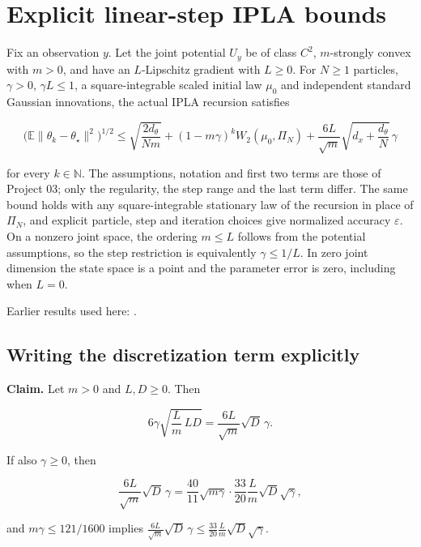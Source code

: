 \documentclass[11pt,a4paper]{report}
\begin{document}
\section{\texorpdfstring{Explicit linear-step IPLA bounds}{Explicit linear-step IPLA bounds}}
\label{proof-module-WassersteinMixing-IPLATheorem-lean}


Fix an observation \(y\). Let the joint potential \(U_y\) be of class \(C^2\), \(m\)-strongly convex with \(m>0\), and have an \(L\)-Lipschitz gradient with \(L\ge0\). For \(N\ge1\) particles, \(\gamma>0\), \(\gamma L\le1\), a square-integrable scaled initial law \(\mu_0\) and independent standard Gaussian innovations, the actual IPLA recursion satisfies

\[\bigl(\mathbb E\|\theta_k-\theta_\star\|^2\bigr)^{1/2}\le\sqrt{\frac{2d_\theta}{Nm}}+(1-m\gamma)^kW_2(\mu_0,\Pi_N)+\frac{6L}{\sqrt m}\sqrt{d_x+\frac{d_\theta}N}\,\gamma\]

for every \(k\in\mathbb N\). The assumptions, notation and first two terms are those of Project 03; only the regularity, the step range and the last term differ. The same bound holds with any square-integrable stationary law of the recursion in place of \(\Pi_N\), and explicit particle, step and iteration choices give normalized accuracy \(\varepsilon\). On a nonzero joint space, the ordering \(m\le L\) follows from the potential assumptions, so the step restriction is equivalently \(\gamma\le1/L\). In zero joint dimension the state space is a point and the parameter error is zero, including when \(L=0\).



Earlier results used here: \cite[Section~3.18]{LangevinLean2026IPLA}.
\subsection{\texorpdfstring{Writing the discretization term explicitly}{Writing the discretization term explicitly}}
\label{report-step-WassersteinMixing-IPLATheorem-lean-1}


\textbf{Claim.} Let \(m>0\) and \(L,D\ge0\). Then

\[6\gamma\sqrt{\frac Lm\,LD}=\frac{6L}{\sqrt m}\sqrt D\,\gamma.\]

If also \(\gamma\ge0\), then

\[\frac{6L}{\sqrt m}\sqrt D\,\gamma=\frac{40}{11}\sqrt{m\gamma}\cdot\frac{33}{20}\frac Lm\sqrt D\sqrt\gamma,\]

and \(m\gamma\le121/1600\) implies \(\frac{6L}{\sqrt m}\sqrt D\,\gamma\le\frac{33}{20}\frac Lm\sqrt D\sqrt\gamma\).
\end{document}
